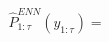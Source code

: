 \documentclass[preview]{standalone}
\begin{document}
\begin{align*}
\hat{P}_{1:\tau}^{ENN} (y_{1:\tau}) =
\end{align*}
\end{document}
